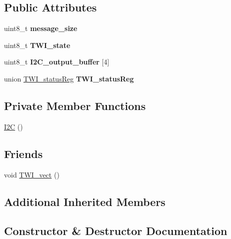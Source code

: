 \subsection*{Public Attributes}
\begin{DoxyCompactItemize}
\item 
\hypertarget{class_i2_c_a88add0edd8c518054944a8188ab11d0c}{}\label{class_i2_c_a88add0edd8c518054944a8188ab11d0c} 
uint8\+\_\+t {\bfseries message\+\_\+size}
\item 
\hypertarget{class_i2_c_aeb2f95017c3d3440a3fc27a20994fac7}{}\label{class_i2_c_aeb2f95017c3d3440a3fc27a20994fac7} 
uint8\+\_\+t {\bfseries T\+W\+I\+\_\+state}
\item 
\hypertarget{class_i2_c_a4de289c8a3651d7b6aaca518844bb3f1}{}\label{class_i2_c_a4de289c8a3651d7b6aaca518844bb3f1} 
uint8\+\_\+t {\bfseries I2\+C\+\_\+output\+\_\+buffer} \mbox{[}4\mbox{]}
\item 
\hypertarget{class_i2_c_a07cc6b21ede25e6b3ef1e9b3131108e6}{}\label{class_i2_c_a07cc6b21ede25e6b3ef1e9b3131108e6} 
union \hyperlink{union_t_w_i__status_reg}{T\+W\+I\+\_\+status\+Reg} {\bfseries T\+W\+I\+\_\+status\+Reg}
\end{DoxyCompactItemize}
\subsection*{Private Member Functions}
\begin{DoxyCompactItemize}
\item 
\hyperlink{class_i2_c_a7a9a84fccdacb3346ff97d6f3e158850}{I2C} ()
\end{DoxyCompactItemize}
\subsection*{Friends}
\begin{DoxyCompactItemize}
\item 
void \hyperlink{class_i2_c_a9d6ec6457f300cca833eb7193feabfbc}{T\+W\+I\+\_\+vect} ()
\end{DoxyCompactItemize}
\subsection*{Additional Inherited Members}


\subsection{Constructor \& Destructor Documentation}
\hypertarget{class_i2_c_a7a9a84fccdacb3346ff97d6f3e158850}{}\label{class_i2_c_a7a9a84fccdacb3346ff97d6f3e158850} 
